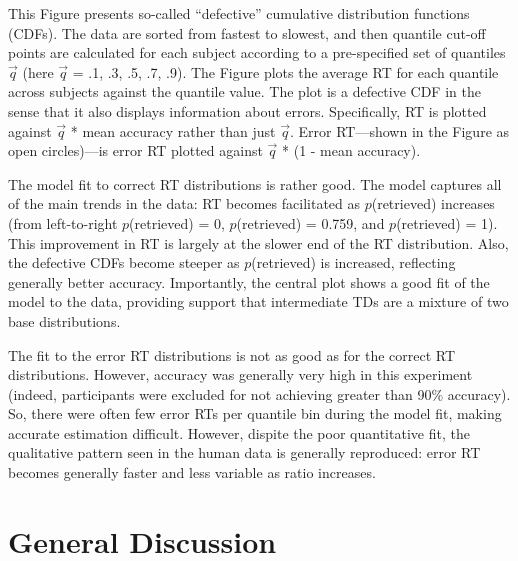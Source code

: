 \documentclass[a4paper, jou, natbib]{apa6}
\begin{document}
This Figure presents so-called ``defective'' cumulative distribution functions (CDFs). The data are sorted from fastest to slowest, and then quantile cut-off points are calculated for each subject according to a pre-specified set of quantiles $\vec{q}$ (here $\vec{q}$ = .1, .3, .5, .7, .9). The Figure plots the average RT for each quantile across subjects against the quantile value. The plot is a defective CDF in the sense that it also displays information about errors. Specifically, RT is plotted against $\vec{q}$ * mean accuracy rather than just $\vec{q}$. Error RT---shown in the Figure as open circles)---is error RT plotted against $\vec{q}$ * (1 - mean accuracy).

The model fit to correct RT distributions is rather good. The model captures all of the main trends in the data: RT becomes facilitated as $p$(retrieved) increases (from left-to-right $p$(retrieved) = 0, $p$(retrieved) = 0.759, and $p$(retrieved) = 1). This improvement in RT is largely at the slower end of the RT distribution. Also, the defective CDFs become steeper as $p$(retrieved) is increased, reflecting generally better accuracy. Importantly, the central plot shows a good fit of the model to the data, providing support that intermediate TDs are a mixture of two base distributions. 

The fit to the error RT distributions is not as good as for the correct RT distributions. However, accuracy was generally very high in this experiment (indeed, participants were excluded for not achieving greater than 90\% accuracy). So, there were often few error RTs per quantile bin during the model fit, making accurate estimation difficult. However, dispite the poor quantitative fit, the qualitative pattern seen in the human data is generally reproduced: error RT becomes generally faster and less variable as ratio increases.


\section{General Discussion}





\appendix
\end{document}
